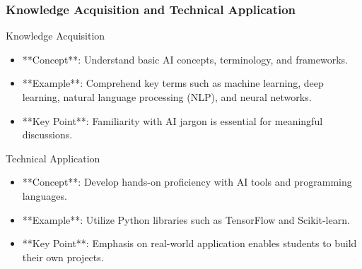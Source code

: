 \documentclass[aspectratio=169]{beamer}
\begin{document}
\begin{frame}[fragile]
    \frametitle{Knowledge Acquisition and Technical Application}
    \begin{block}{Knowledge Acquisition}
        \begin{itemize}
            \item **Concept**: Understand basic AI concepts, terminology, and frameworks.
            \item **Example**: Comprehend key terms such as machine learning, deep learning, natural language processing (NLP), and neural networks.
            \item **Key Point**: Familiarity with AI jargon is essential for meaningful discussions.
        \end{itemize}
    \end{block}
    
    \begin{block}{Technical Application}
        \begin{itemize}
            \item **Concept**: Develop hands-on proficiency with AI tools and programming languages.
            \item **Example**: Utilize Python libraries such as TensorFlow and Scikit-learn.
            \item **Key Point**: Emphasis on real-world application enables students to build their own projects.
        \end{itemize}
    \end{block}
\end{frame}
\end{document}
